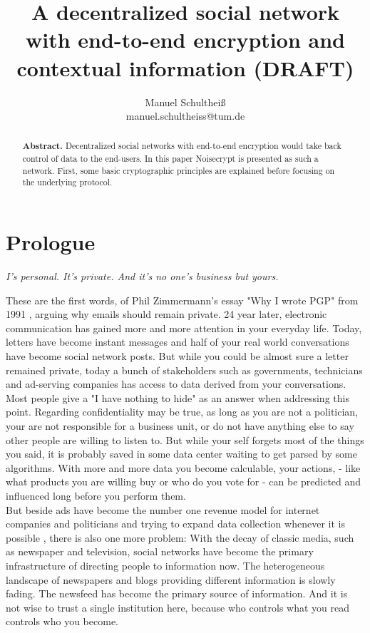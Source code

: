 \documentclass{scrartcl}
\title{A decentralized social network with end-to-end encryption and contextual information (DRAFT)}
\author{Manuel Schultheiß\\manuel.schultheiss@tum.de}
\begin{document}
  \sloppy %
 
\maketitle

\begin{abstract}
\noindent
  \textbf{Abstract.} 
  Decentralized social networks with end-to-end encryption would take back control of data to the end-users. In this paper Noisecrypt is presented as such a network. First, some  basic cryptographic  principles are explained before focusing on the underlying  protocol.
  \end{abstract}
  
  
\tableofcontents
 \newpage
\section{Prologue}

\begin{center}
\textit{I's personal. It's private.
And it's no one's business but yours.}
\end{center}

These are the first words, of Phil Zimmermann's essay "Why I wrote PGP" from 1991 \cite{PHIL}, arguing why emails should remain private. 24 year later, electronic communication has gained more and more attention in your everyday life. Today, letters have become instant messages and half of your real world conversations have become social network posts. But while you could be almost sure a letter remained private, today a bunch of stakeholders such as governments, technicians and ad-serving companies has access to data derived from your conversations. \\


Most people give a "I have nothing to hide" as an answer when addressing this point. Regarding confidentiality may be true, as long as you are not a politician, your are not responsible for a business unit, or do not have anything else to say other people are willing to listen to. But while your self forgets most of the things you said, it is probably saved in some data center waiting to get parsed by some algorithms. With more and more data you become calculable, your actions, - like what products you are willing buy or who do you vote for - can be predicted and influenced long before you perform them.\\


But beside ads have become the number one revenue model for internet companies and politicians and trying to expand data collection  whenever it is possible \cite{EFF}, there is also one more problem: With the decay of classic media, such as newspaper and television, social networks have become the primary infrastructure of directing people to information now. The heterogeneous  landscape of newspapers and blogs providing different information is slowly fading. The newsfeed has become the primary source of information. And it is not  wise to trust a single institution  here, because who controls what you read controls who you become.
\end{document}
